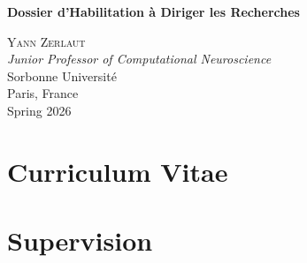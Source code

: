 \documentclass[12pt,twoside]{report}
\date{}
\author{Yann Zerlaut}
\begin{document}
\singlespacing
\begin{titlepage}
\begin{center}

        \vspace*{3cm}
        \vfill
            
        \Large
        \textbf{Dossier d'Habilitation à Diriger les Recherches}
            
        \vspace{1.4cm}

        \textsc{Yann Zerlaut}\\
        \vspace{.8cm}
        \large
        \textit{Junior Professor of Computational Neuroscience}\\ 
        \vspace{.3cm}
        \Large
        Sorbonne Université\\
        Paris, France\\

        \vspace{8cm}
        Spring 2026
            
    \end{center}
\end{titlepage}

\vspace{-8em}

\tableofcontents

\part{Curriculum Vitae}
\label{part:cv}

\onehalfspacing


\singlespacing


\onehalfspacing


\singlespacing


\singlespacing


\part{Supervision}
\label{part:supervision}
\end{document}
